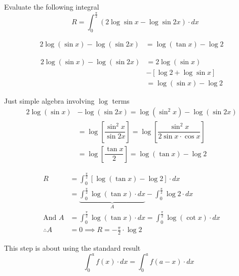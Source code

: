 \documentclass[14pt,fleqn]{extarticle}
\begin{document}
Evaluate the following integral 
\[ \quad R = \int_0^{\frac\pi{2}} \left(2\log\sin x - \log\sin 2x \right)\cdot dx \] 

\newcard 

\begin{align}
	2\log \left( \sin x \right) - \log \left(\sin 2x \right) &= \log \left(\tan x \right) - \log 2 
\end{align}

\newcard 

\begin{align}
	2\log \left( \sin x \right) - \log \left(\sin 2x \right) &= 
	2\log \left(\sin x \right) \\
	&-\left[\log 2 + \log \sin x \right] \\ 
	&= \log \left(\sin x \right) -\log 2 
\end{align}

\newcard 

Just simple algebra involving $\log$ terms
\begin{align}
	2\log \left( \sin x \right) &- \log \left(\sin 2x \right) =\log \left(\sin^2 x \right)-\log \left(\sin 2x \right) \\
	&= \log \left[\dfrac{\sin^2 x}{\sin 2x} \right] = \log \left[\dfrac{\sin^2 x}{2\sin x \cdot\cos x}\right] \\
	&= \log \left[\dfrac{\tan x}{2} \right] = \log \left(\tan x \right)-\log 2
\end{align}

\newcard 

\begin{align}
R &= \int_0^{\frac\pi{2}} \left[\log \left(\tan x \right) - \log 2 \right]\cdot dx \\
&= \underbrace{\int_0^{\frac\pi{2}}\log \left(\tan x \right)\cdot dx}_{A} - \int_0^{\frac\pi{2}}\log 2\cdot dx \\
\text{And } A &= \int_0^{\frac\pi{2}}\log \left(\tan x \right)\cdot dx 
=\int_0^{\frac\pi{2}}\log \left(\cot x \right)\cdot dx \\
\therefore A &= 0 \implies R = -\frac\pi{2}\cdot\log 2
\end{align}

\newcard 

This step is about using the standard result 
\[\qquad \int_0^a f(x)\cdot dx = \int_0^a f \left(a-x \right)\cdot dx  \]
\end{document}

